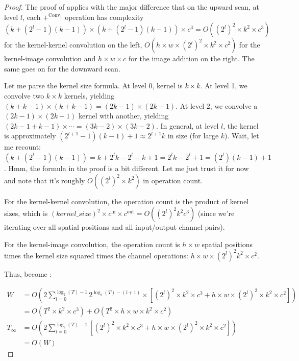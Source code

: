 \begin{proof}
The proof of  applies with the major difference that on the upward scan, at level $l$, each $+^{\mathrm{Conv}_1}$ operation has complexity $(k+(2^l-1)(k-1))\times (k+(2^l-1)(k-1))\times c^3 = O((2^l)^2\times k^2 \times c^3)$ for the kernel-kernel convolution on the left, $O(h \times w \times (2^l)^2\times k^2 \times c^2)$ for the kernel-image convolution and $h \times w\times c$ for the image addition on the right. The same goes on for the downward scan.

\begin{ThomasAnnotation}
Let me parse the kernel size formula. At level 0, kernel is $k \times k$. At level 1, we convolve two $k \times k$ kernels, yielding $(k + k - 1) \times (k + k - 1) = (2k - 1) \times (2k - 1)$. At level 2, we convolve a $(2k-1) \times (2k-1)$ kernel with another, yielding $(2k - 1 + k - 1) \times \cdots = (3k - 2) \times (3k - 2)$. In general, at level $l$, the kernel is approximately $(2^{l+1} - 1)(k - 1) + 1 \approx 2^{l+1} k$ in size (for large $k$). Wait, let me recount: $(k + (2^l - 1)(k - 1)) = k + 2^l k - 2^l - k + 1 = 2^l k - 2^l + 1 = (2^l)(k-1) + 1$. Hmm, the formula in the proof is a bit different. Let me just trust it for now and note that it's roughly $O((2^l)^2 \times k^2)$ in operation count.

For the kernel-kernel convolution, the operation count is the product of kernel sizes, which is $(kernel\_size)^2 \times c^{\text{in}} \times c^{\text{out}} = O((2^l)^2 k^2 c^3)$ (since we're iterating over all spatial positions and all input/output channel pairs).

For the kernel-image convolution, the operation count is $h \times w$ spatial positions times the kernel size squared times the channel operations: $h \times w \times (2^l)^2 k^2 \times c^2$.
\end{ThomasAnnotation}

Thus,  become :

\begin{align}
\label{eq:W_conv}
W &= O(2 \sum_{l=0}^{\log_2(T)-1} 2^{\log_2(T)-(l+1)} \times \left[ (2^l)^2\times k^2 \times c^3 + h \times w \times (2^l)^2\times k^2 \times c^2\right])\\
&= O(T^2 \times k^2 \times c^3) + O(T^2 \times h \times w \times k^2 \times c^2)\\
\label{eq:T_conv}
T_\infty&= O(2\sum_{l=0}^{\log_2(T)-1} \left[ (2^l)^2\times k^2 \times c^3 + h \times w \times (2^l)^2\times k^2 \times c^2\right])\\
&= O(W)
\end{align}
\end{proof}

